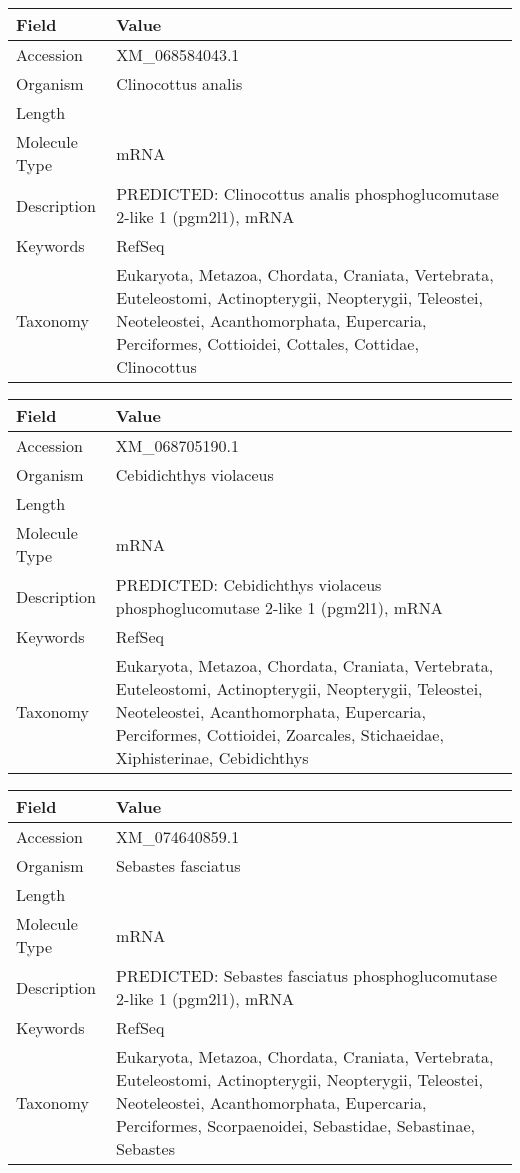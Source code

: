 \documentclass[10pt]{article}
\begin{document}
\vspace{1em}
{\footnotesize
\begin{longtable}{>{\raggedright\arraybackslash}p{4.5cm} >{\raggedright\arraybackslash}p{11.5cm}}
\textbf{Field} & \textbf{Value} \\
\hline
Accession & XM\_068584043.1 \\
Organism & Clinocottus analis \\
Length & 3066 \\
Molecule Type & mRNA \\
Description & PREDICTED: Clinocottus analis phosphoglucomutase 2-like 1 (pgm2l1), mRNA \\
Keywords & RefSeq \\
Taxonomy & Eukaryota, Metazoa, Chordata, Craniata, Vertebrata, Euteleostomi, Actinopterygii, Neopterygii, Teleostei, Neoteleostei, Acanthomorphata, Eupercaria, Perciformes, Cottioidei, Cottales, Cottidae, Clinocottus \\
\end{longtable}
}

\vspace{1em}
{\footnotesize
\begin{longtable}{>{\raggedright\arraybackslash}p{4.5cm} >{\raggedright\arraybackslash}p{11.5cm}}
\textbf{Field} & \textbf{Value} \\
\hline
Accession & XM\_068705190.1 \\
Organism & Cebidichthys violaceus \\
Length & 2962 \\
Molecule Type & mRNA \\
Description & PREDICTED: Cebidichthys violaceus phosphoglucomutase 2-like 1 (pgm2l1), mRNA \\
Keywords & RefSeq \\
Taxonomy & Eukaryota, Metazoa, Chordata, Craniata, Vertebrata, Euteleostomi, Actinopterygii, Neopterygii, Teleostei, Neoteleostei, Acanthomorphata, Eupercaria, Perciformes, Cottioidei, Zoarcales, Stichaeidae, Xiphisterinae, Cebidichthys \\
\end{longtable}
}

\vspace{1em}
{\footnotesize
\begin{longtable}{>{\raggedright\arraybackslash}p{4.5cm} >{\raggedright\arraybackslash}p{11.5cm}}
\textbf{Field} & \textbf{Value} \\
\hline
Accession & XM\_074640859.1 \\
Organism & Sebastes fasciatus \\
Length & 2725 \\
Molecule Type & mRNA \\
Description & PREDICTED: Sebastes fasciatus phosphoglucomutase 2-like 1 (pgm2l1), mRNA \\
Keywords & RefSeq \\
Taxonomy & Eukaryota, Metazoa, Chordata, Craniata, Vertebrata, Euteleostomi, Actinopterygii, Neopterygii, Teleostei, Neoteleostei, Acanthomorphata, Eupercaria, Perciformes, Scorpaenoidei, Sebastidae, Sebastinae, Sebastes \\
\end{longtable}
}
\end{document}
